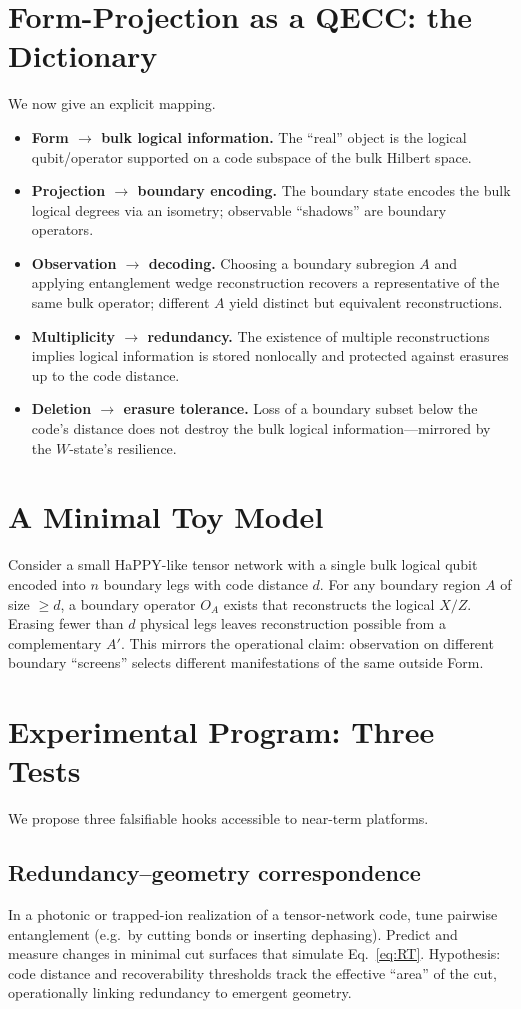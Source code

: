 \documentclass[11pt]{article}
\begin{document}
\section{Form-Projection as a QECC: the Dictionary}
We now give an explicit mapping.
\begin{itemize}
    \item \textbf{Form $\to$ bulk logical information.} The ``real'' object is the logical qubit/operator supported on a code subspace of the bulk Hilbert space.
    \item \textbf{Projection $\to$ boundary encoding.} The boundary state encodes the bulk logical degrees via an isometry; observable ``shadows'' are boundary operators.
    \item \textbf{Observation $\to$ decoding.} Choosing a boundary subregion $A$ and applying entanglement wedge reconstruction recovers a representative of the same bulk operator; different $A$ yield distinct but equivalent reconstructions.
    \item \textbf{Multiplicity $\to$ redundancy.} The existence of multiple reconstructions implies logical information is stored nonlocally and protected against erasures up to the code distance.
    \item \textbf{Deletion $\to$ erasure tolerance.} Loss of a boundary subset below the code's distance does not destroy the bulk logical information---mirrored by the $W$-state's resilience.
\end{itemize}

\section{A Minimal Toy Model}
Consider a small HaPPY-like tensor network with a single bulk logical qubit encoded into $n$ boundary legs with code distance $d$. For any boundary region $A$ of size $\geq d$, a boundary operator $O_A$ exists that reconstructs the logical $X/Z$. Erasing fewer than $d$ physical legs leaves reconstruction possible from a complementary $A'$. This mirrors the operational claim: observation on different boundary ``screens'' selects different manifestations of the same outside Form.

\section{Experimental Program: Three Tests}
We propose three falsifiable hooks accessible to near-term platforms.
\subsection{Redundancy--geometry correspondence}
In a photonic or trapped-ion realization of a tensor-network code, tune pairwise entanglement (e.g.\ by cutting bonds or inserting dephasing). Predict and measure changes in minimal cut surfaces that simulate Eq.~\eqref{eq:RT}. Hypothesis: code distance and recoverability thresholds track the effective ``area'' of the cut, operationally linking redundancy to emergent geometry.
\end{document}
